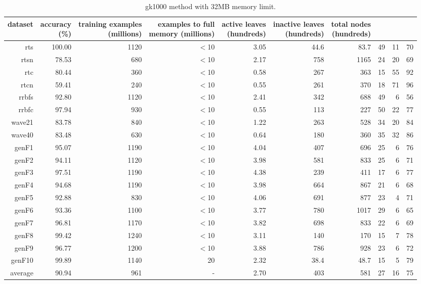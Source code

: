 \clearpage
\begin{table}
\caption{{\sc gk1000} method with 32MB memory limit.}
\label{tab:gk1000-32MB}
\centering
\begin{tabular}{|r|r|r|r|r|r|r|r|r|r|}
\hline
dataset	&
\rotatebox{90}{\parbox{9em}{accuracy\\(\%)}} &
\rotatebox{90}{\parbox{9em}{training examples\\(millions)}} &
\rotatebox{90}{\parbox{9em}{examples to full\\memory (millions)}} &
\rotatebox{90}{\parbox{9em}{active leaves\\(hundreds)}} &
\rotatebox{90}{\parbox{9em}{inactive leaves\\(hundreds)}} &
\rotatebox{90}{\parbox{9em}{total nodes\\(hundreds)}} &
\rotatebox{90}{\parbox{9em}{tree depth}}	&
\rotatebox{90}{\parbox{9em}{training speed (\%)}} &
\rotatebox{90}{\parbox{9em}{prediction speed (\%)}} \\
\hline
{\sc rts} & 100.00 & 1120 & $<$10 & 3.05 & 44.6 & 83.7 & 49 & 11 & 70 \\
{\sc rtsn} & 78.53 & 680 & $<$10 & 2.17 & 758 & 1165 & 24 & 20 & 69 \\
{\sc rtc} & 80.44 & 360 & $<$10 & 0.58 & 267 & 363 & 15 & 55 & 92 \\
{\sc rtcn} & 59.41 & 240 & $<$10 & 0.55 & 261 & 370 & 18 & 71 & 96 \\
{\sc rrbfs} & 92.80 & 1120 & $<$10 & 2.41 & 342 & 688 & 49 & 6 & 56 \\
{\sc rrbfc} & 97.94 & 930 & $<$10 & 0.55 & 113 & 227 & 50 & 22 & 77 \\
{\sc wave21} & 83.78 & 840 & $<$10 & 1.22 & 263 & 528 & 34 & 20 & 84 \\
{\sc wave40} & 83.48 & 630 & $<$10 & 0.64 & 180 & 360 & 35 & 32 & 86 \\
{\sc genF1} & 95.07 & 1190 & $<$10 & 4.04 & 407 & 696 & 25 & 6 & 76 \\
{\sc genF2} & 94.11 & 1120 & $<$10 & 3.98 & 581 & 833 & 25 & 6 & 71 \\
{\sc genF3} & 97.51 & 1190 & $<$10 & 4.38 & 239 & 411 & 17 & 6 & 77 \\
{\sc genF4} & 94.68 & 1190 & $<$10 & 3.98 & 664 & 867 & 21 & 6 & 68 \\
{\sc genF5} & 92.88 & 830 & $<$10 & 4.06 & 691 & 877 & 23 & 4 & 71 \\
{\sc genF6} & 93.36 & 1100 & $<$10 & 3.77 & 780 & 1017 & 29 & 6 & 65 \\
{\sc genF7} & 96.81 & 1170 & $<$10 & 3.82 & 698 & 833 & 22 & 6 & 69 \\
{\sc genF8} & 99.42 & 1240 & $<$10 & 3.11 & 140 & 170 & 15 & 7 & 78 \\
{\sc genF9} & 96.77 & 1200 & $<$10 & 3.88 & 786 & 928 & 23 & 6 & 72 \\
{\sc genF10} & 99.89 & 1140 & 20 & 2.32 & 38.4 & 48.7 & 15 & 5 & 79 \\
\hline
average & 90.94 & 961 &  -  & 2.70 & 403 & 581 & 27 & 16 & 75 \\
\hline
\end{tabular}
\end{table}
